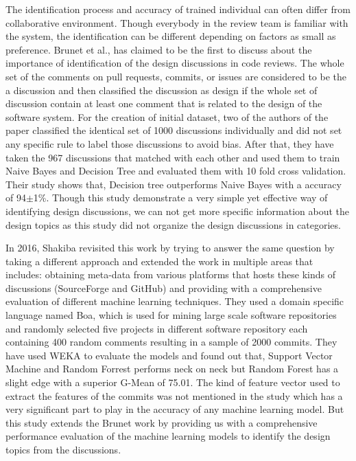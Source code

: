 The identification process and accuracy of trained individual can often differ from collaborative environment. Though everybody in the review team is familiar \cite{Sousa2017} with the system, the identification can be different depending on factors as small as preference. Brunet et al.,\cite{Brunet2014a} has claimed to be the first to discuss about the importance of identification of the design discussions in code reviews. The whole set of the comments on pull requests, commits, or issues are considered to be the a discussion and then classified the discussion as design if the whole set of discussion contain at least one comment that is related to the design of the software system. For the creation of initial dataset, two of the authors of the paper classified the identical set of 1000 discussions individually and did not set any specific rule to label those discussions to avoid bias. After that, they have taken the 967 discussions that matched with each other and used them to train Naive Bayes and Decision Tree and evaluated them with 10 fold cross validation. Their study shows that, Decision tree outperforms Naive Bayes with a accuracy of 94{$\pm$}1\%. Though this study demonstrate a very simple yet effective way of identifying design discussions, we can not get more specific information about the design topics as this study did not organize the design discussions in categories. 

In 2016, Shakiba \cite{Shakiba2016} revisited this work by trying to answer the same question by taking a different approach and extended the work in multiple areas that includes: obtaining meta-data from various platforms that hosts these kinds of discussions (SourceForge and GitHub) and providing with a comprehensive evaluation of different machine learning techniques. They used a domain specific language named Boa, which is used for mining large scale software repositories and randomly selected five projects in different software repository each containing 400 random comments resulting in a sample of 2000 commits. They have used WEKA to evaluate the models and found out that, Support Vector Machine and Random Forrest performs neck on neck but Random Forest has a slight edge with a superior G-Mean of 75.01. The kind of feature vector used to extract the features of the commits was not mentioned in the study which has a very significant part to play in the accuracy of any machine learning model. But this study extends the Brunet work by providing us with a comprehensive performance evaluation of the machine learning models to identify the design topics from the discussions.

